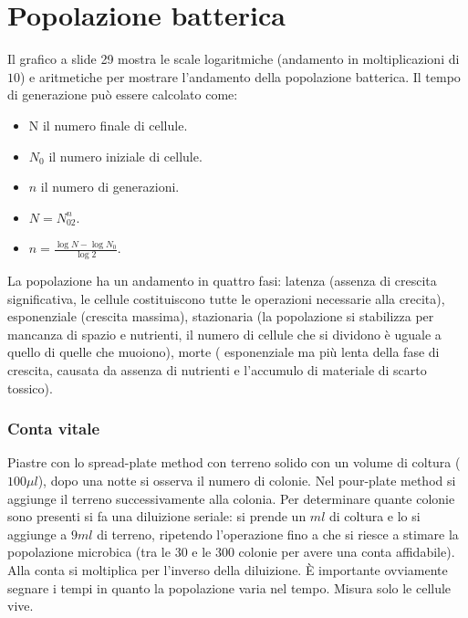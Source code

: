 \chapter{Popolazione batterica}
Il grafico a slide 29 mostra le scale logaritmiche (andamento in moltiplicazioni di $10$) e aritmetiche per mostrare l'andamento della popolazione batterica. Il tempo di generazione 
pu\`o essere calcolato come:
\begin{itemize}
	\item N il numero finale di cellule.
	\item $N_0$ il numero iniziale di cellule.
	\item $n$ il numero di generazioni.
	\item $N=N_02^n$.
	\item $n=\frac{\log N - \log N_0}{\log 2}$.
\end{itemize}
La popolazione ha un andamento in quattro fasi: latenza (assenza di crescita significativa, le cellule costituiscono tutte le operazioni necessarie alla crecita), esponenziale (crescita 
massima), stazionaria (la popolazione si stabilizza per mancanza di spazio e nutrienti, il numero di cellule che si dividono \`e uguale a quello di quelle che muoiono), morte (
esponenziale ma pi\`u lenta della fase di crescita, causata da assenza di nutrienti e l'accumulo di materiale di scarto tossico). 
\subsection{Conta vitale}
Piastre con lo spread-plate method con terreno solido con un volume di coltura ($100 \mu l$), dopo una notte si osserva il numero di colonie. Nel pour-plate method si aggiunge il terreno
successivamente alla colonia. Per determinare quante colonie sono presenti si fa una diluizione seriale: si prende un $ml$ di coltura e lo si aggiunge a $9ml$ di terreno, ripetendo 
l'operazione fino a che si riesce a stimare la popolazione microbica (tra le $30$ e le $300$ colonie per avere una conta affidabile). Alla conta si moltiplica per l'inverso della 
diluizione. \`E importante ovviamente segnare i tempi in quanto la popolazione varia nel tempo. Misura solo le cellule vive.
